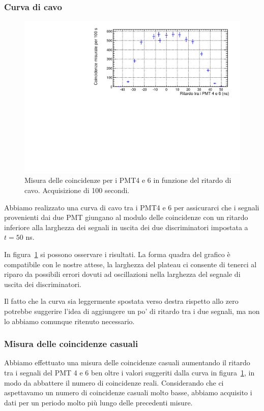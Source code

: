 \documentclass[a4paper,10pt]{article}
\begin{document}
\subsubsection{Curva di cavo}
\begin{figure}
\centering
\includegraphics[width=\textwidth]{fig/delay_curve}
\caption{Misura delle coincidenze per i PMT4 e 6 in funzione del ritardo di cavo. Acquisizione di 100 secondi.}
\label{fig:delay_curve}
\end{figure}
Abbiamo realizzato una curva di cavo tra i PMT4 e 6 per assicurarci che i segnali provenienti dai due PMT giungano al modulo delle coincidenze con un ritardo inferiore alla larghezza dei segnali in uscita dei due discriminatori impostata a $t = 50$ ns. 

In figura~\ref{fig:delay_curve} si possono osservare i risultati. La forma quadra del grafico è compatibile con le nostre attese, la larghezza del plateau ci consente di tenerci al riparo da possibili errori dovuti ad oscillazioni nella larghezza del segnale di uscita dei discriminatori. 

Il fatto che la curva sia leggermente spostata verso destra rispetto allo zero potrebbe suggerire l'idea di aggiungere un po' di ritardo tra i due segnali, ma non lo abbiamo comunque ritenuto necessario.
\subsubsection{Misura delle coincidenze casuali}
Abbiamo effettuato una misura delle coincidenze casuali aumentando il ritardo tra i segnali del PMT 4 e 6 ben oltre i valori suggeriti dalla curva in figura~\ref{fig:delay_curve}, in modo da abbattere il numero di coincidenze reali. Considerando che ci aspettavamo un numero di coincidenze casuali molto basse, abbiamo acquisito i dati per un periodo molto più lungo delle precedenti misure.
\end{document}
